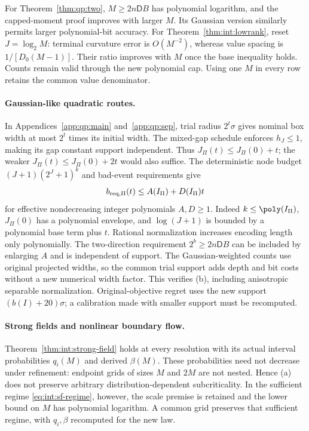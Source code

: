 For Theorem~\ref{thm:qp:two}, $M\ge2n\mathsf DB$ has polynomial
logarithm, and the capped-moment proof improves with larger $M$.
Its Gaussian version similarly permits larger polynomial-bit accuracy.
For Theorem~\ref{thm:int:lowrank}, reset $J=\log_2M$: terminal curvature
error is $O(M^{-2})$, whereas value spacing is $1/[D_0(M-1)]$.
Their ratio improves with $M$ once the base inequality holds. Counts
remain valid through the new polynomial cap. Using one $M$ in every
row retains the common value denominator.

\paragraph{Gaussian-like quadratic routes.}
In Appendices~\ref{app:qp:main} and~\ref{app:qp:sep}, trial radius
$2^t\sigma$ gives nominal box width at most $2^t$ times its initial
width. The mixed-gap schedule enforces $h_J\le1$, making its gap
constant support independent. Thus $J_\Pi(t)\le J_\Pi(0)+t$; the
weaker $J_\Pi(t)\le J_\Pi(0)+2t$ would also suffice. The deterministic
node budget $(J+1)(2^J+1)^k$ and bad-event requirements give
\[
 b_{\rm req,\Pi}(t)\le A(I_\Pi)+D(I_\Pi)t
\]
for effective nondecreasing integer polynomials $A,D\ge1$. Indeed
$k\le\poly(I_\Pi)$, $J_\Pi(0)$ has a polynomial envelope, and
$\log(J+1)$ is bounded by a polynomial base term plus $t$. Rational
normalization increases encoding length only polynomially. The
two-direction requirement $2^b\ge2n\mathsf DB$ can be included by
enlarging $A$ and is independent of support. The Gaussian-weighted
counts use original projected widths, so the common trial support adds
depth and bit costs without a new numerical width factor. This verifies
(b), including anisotropic separable normalization. Original-objective
regret uses the new support $(b(I)+20)\sigma$; a calibration made with
smaller support must be recomputed.

\paragraph{Strong fields and nonlinear boundary flow.}
Theorem~\ref{thm:int:strong-field} holds at every resolution with its
actual interval probabilities $q_i(M)$ and derived $\beta(M)$. These
probabilities need not decrease under refinement: endpoint grids of
sizes $M$ and $2M$ are not nested. Hence (a) does not preserve arbitrary
distribution-dependent subcriticality. In the sufficient regime
\eqref{eq:int:sf-regime}, however, the scale premise is retained and
the lower bound on $M$ has polynomial logarithm. A common grid preserves
that sufficient regime, with $q_i,\beta$ recomputed for the new law.


